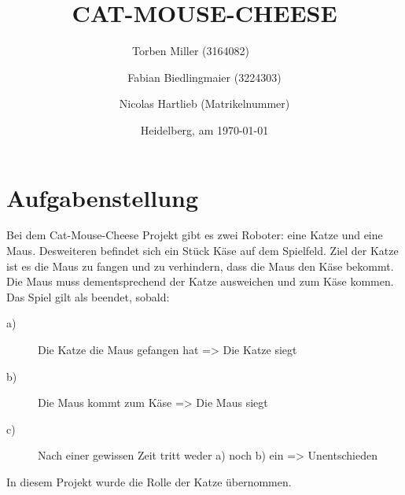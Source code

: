 \documentclass[
a4paper,     %
12pt         %
]{scrartcl}  %
\title{CAT-MOUSE-CHEESE}
\author{Torben Miller (3164082)\ \ \ \ \ \and
Fabian Biedlingmaier (3224303)        \and
Nicolas Hartlieb (Matrikelnummer)}
\date{Heidelberg, am \today{}}
\begin{document}

 \maketitle

 \newpage
 \tableofcontents

 \newpage
 \listoffigures


 \newpage



\section{Aufgabenstellung}
Bei dem \glqq Cat-Mouse-Cheese\grqq{} Projekt gibt es zwei Roboter: eine Katze und eine Maus. Desweiteren befindet sich ein Stück Käse auf dem Spielfeld.
Ziel der Katze ist es die Maus zu fangen und zu verhindern, dass die Maus den Käse bekommt.
Die Maus muss dementsprechend der Katze ausweichen und zum Käse kommen.
Das Spiel gilt als beendet, sobald:
\begin{description}
\item[a)]Die Katze die Maus gefangen hat => Die Katze siegt
\item[b)] Die Maus kommt zum Käse => Die Maus siegt
\item[c)] Nach einer gewissen Zeit tritt weder a) noch b) ein => Unentschieden
\end{description}
In diesem Projekt wurde die Rolle der Katze übernommen.
\end{document}
